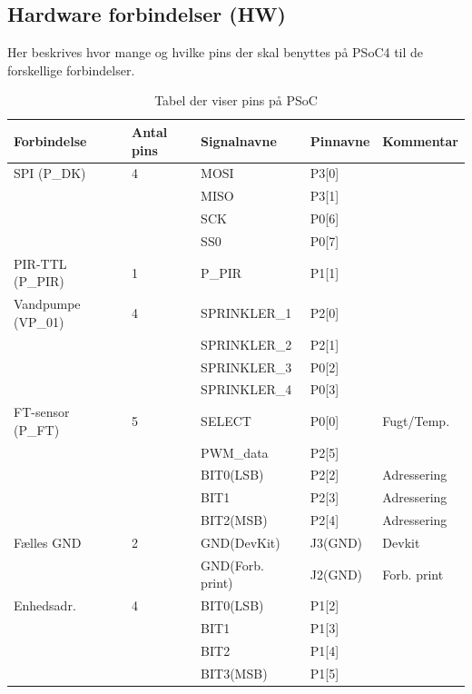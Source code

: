 \begin{table}[H]
\subsection{Hardware forbindelser (HW)}
Her beskrives hvor mange og hvilke pins der skal benyttes på PSoC4 til de forskellige forbindelser.
\caption{Tabel der viser pins på PSoC}
\begin{small}
\begin{tabular}{|p{}|p{2cm}|p{}|p{}|p{2.6cm}|}
\hline

\textbf{Forbindelse}	&\textbf{Antal pins} 	&\textbf{Signalnavne} &\textbf{Pinnavne} &\textbf{Kommentar}  \\ \hline

SPI 	(P\_DK)			&4 						&MOSI				&P3[0]		&					\\\cline{3-4}
					&						&MISO				&P3[1]		&					\\\cline{3-4}
					&						&SCK					&P0[6]		&					\\\cline{3-4}
					&						&SS0					&P0[7]		&					\\\hline
	
PIR-TTL	(P\_PIR)		&1 						&P\_PIR				&P1[1] 		&					\\\hline

Vandpumpe (VP\_01)	&4 						&SPRINKLER\_1		&P2[0]		&					\\\cline{3-4}
					&						&SPRINKLER\_2		&P2[1]		&					\\\cline{3-4}
					&						&SPRINKLER\_3		&P0[2]		&					\\\cline{3-4}
					&						&SPRINKLER\_4		&P0[3]		&					\\\hline
		
FT-sensor (P\_FT)	&5						&SELECT				&P0[0]		&Fugt/Temp.			\\\cline{3-5}
					&						&PWM\_data			&P2[5]		&					\\\cline{3-5}
					&						&BIT0(LSB)			&P2[2]		&Adressering			\\\cline{3-5}
					&						&BIT1				&P2[3]		&Adressering			\\\cline{3-5}
					&						&BIT2(MSB)			&P2[4]		&Adressering			\\\hline			
					
Fælles GND			&2 						&GND(DevKit)			&J3(GND) 	&Devkit				\\\cline{3-5}							
					& 						&GND(Forb. print)	&J2(GND) 	&Forb. print			\\\hline					
					
Enhedsadr. 			&4 						&BIT0(LSB)			&P1[2]		&					\\\cline{3-4}
					&						&BIT1				&P1[3]		&					\\\cline{3-4}
					&						&BIT2				&P1[4]		&					\\\cline{3-4}
					&						&BIT3(MSB)			&P1[5]		&					\\\hline

\end{tabular}
\end{small}
\label{table:hwforbindelse}
\end{table}